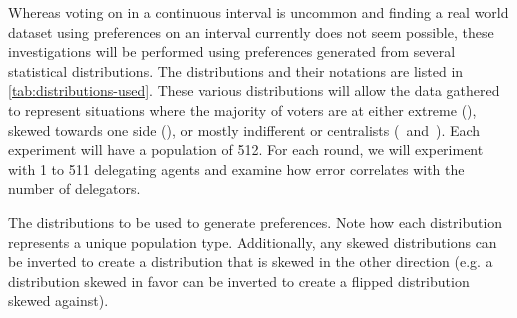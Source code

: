 Whereas voting on in a continuous interval is uncommon and finding a real world dataset
using preferences on an interval currently does not seem possible, these investigations
will be performed using preferences generated from several statistical distributions.
The distributions and their notations are listed in \autoref{tab:distributions-used}.
These various distributions will allow the data gathered to represent situations
where the majority of voters are at either extreme (),
skewed towards one side (), or mostly indifferent or centralists
(\gaussiandist~and~).
Each experiment will have a population of 512.
For each round, we will experiment with 1 to 511 delegating agents and examine how
error correlates with the number of delegators.

\begin{table}[!htbp]
    \renewcommand{\arraystretch}{1.3}

    \caption{
        The distributions to be used to generate preferences.
        Note how each distribution represents a unique population type.
        Additionally, any skewed distributions can be inverted to create a
        distribution that is skewed in the other direction (e.g. a distribution
        skewed in favor can be inverted to create a flipped distribution skewed
        against).
    }
    \label{tab:distributions-used}

    \centering
    
\end{table}
